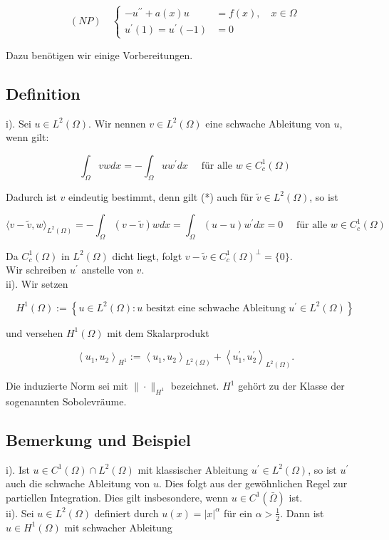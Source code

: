 \documentclass[10pt, letterpaper]{article}
\begin{document}
$$
(N P) \quad\left\{\begin{aligned}
-u^{\prime \prime}+a(x) u & =f(x), \quad x \in \Omega \\
u^{\prime}(1)=u^{\prime}(-1) & =0
\end{aligned}\right.
$$

Dazu benötigen wir einige Vorbereitungen.

\subsection*{Definition}
i). Sei $u \in L^{2}(\Omega)$. Wir nennen $v \in L^{2}(\Omega)$ eine schwache Ableitung von $u$, wenn gilt:

$$
\int_{\Omega} v w d x=-\int_{\Omega} u w^{\prime} d x \quad \text { für alle } w \in C_{c}^{1}(\Omega)
$$

Dadurch ist $v$ eindeutig bestimmt, denn gilt (*) auch für $\tilde{v} \in L^{2}(\Omega)$, so ist

$$
\langle v-\tilde{v}, w\rangle_{L^{2}(\Omega)}=-\int_{\Omega}(v-\tilde{v}) w d x=\int_{\Omega}(u-u) w^{\prime} d x=0 \quad \text { für alle } w \in C_{c}^{1}(\Omega)
$$

Da $C_{c}^{1}(\Omega)$ in $L^{2}(\Omega)$ dicht liegt, folgt $v-\tilde{v} \in C_{c}^{1}(\Omega)^{\perp}=\{0\}$.\\
Wir schreiben $u^{\prime}$ anstelle von $v$.\\
ii). Wir setzen

$$
H^{1}(\Omega):=\left\{u \in L^{2}(\Omega): u \text { besitzt eine schwache Ableitung } u^{\prime} \in L^{2}(\Omega)\right\}
$$

und versehen $H^{1}(\Omega)$ mit dem Skalarprodukt

$$
\left\langle u_{1}, u_{2}\right\rangle_{H^{1}}:=\left\langle u_{1}, u_{2}\right\rangle_{L^{2}(\Omega)}+\left\langle u_{1}^{\prime}, u_{2}^{\prime}\right\rangle_{L^{2}(\Omega)} .
$$

Die induzierte Norm sei mit $\|\cdot\|_{H^{1}}$ bezeichnet. $H^{1}$ gehört zu der Klasse der sogenannten Sobolevräume.

\subsection*{Bemerkung und Beispiel}
i). Ist $u \in C^{1}(\Omega) \cap L^{2}(\Omega)$ mit klassischer Ableitung $u^{\prime} \in L^{2}(\Omega)$, so ist $u^{\prime}$ auch die schwache Ableitung von $u$. Dies folgt aus der gewöhnlichen Regel zur partiellen Integration. Dies gilt insbesondere, wenn $u \in C^{1}(\bar{\Omega})$ ist.\\
ii). Sei $u \in L^{2}(\Omega)$ definiert durch $u(x)=|x|^{\alpha}$ für ein $\alpha>\frac{1}{2}$. Dann ist $u \in H^{1}(\Omega)$ mit schwacher Ableitung
\end{document}
